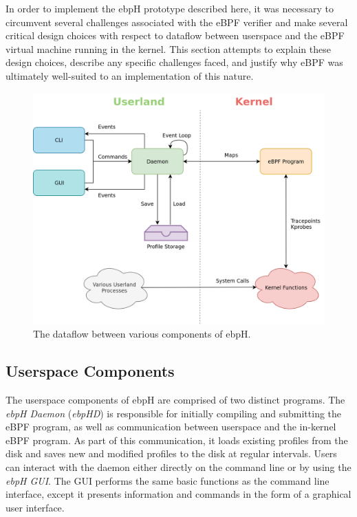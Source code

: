 \documentclass[
  12pt]{findlay}
\begin{document}
In order to implement the ebpH prototype described here, it was
necessary to circumvent several challenges associated with the eBPF
verifier and make several critical design choices with respect to
dataflow between userspace and the eBPF virtual machine running in the
kernel. This section attempts to explain these design choices, describe
any specific challenges faced, and justify why eBPF was ultimately
well-suited to an implementation of this nature.

\begin{figure}
\centering
\includegraphics[width=\textwidth,height=0.4\textheight]{../figures/ebph-dataflow.png}
\caption{\label{ebph-dataflow}The dataflow between various components of
ebpH.}
\end{figure}

\FloatBarrier

\hypertarget{userspace-components}{%
\subsection{Userspace Components}\label{userspace-components}}

The userspace components of ebpH are comprised of two distinct programs.
The \emph{ebpH Daemon} (\emph{ebpHD}) is responsible for initially
compiling and submitting the eBPF program, as well as communication
between userspace and the in-kernel eBPF program. As part of this
communication, it loads existing profiles from the disk and saves new
and modified profiles to the disk at regular intervals. Users can
interact with the daemon either directly on the command line or by using
the \emph{ebpH GUI}. The GUI performs the same basic functions as the
command line interface, except it presents information and commands in
the form of a graphical user interface.
\end{document}
